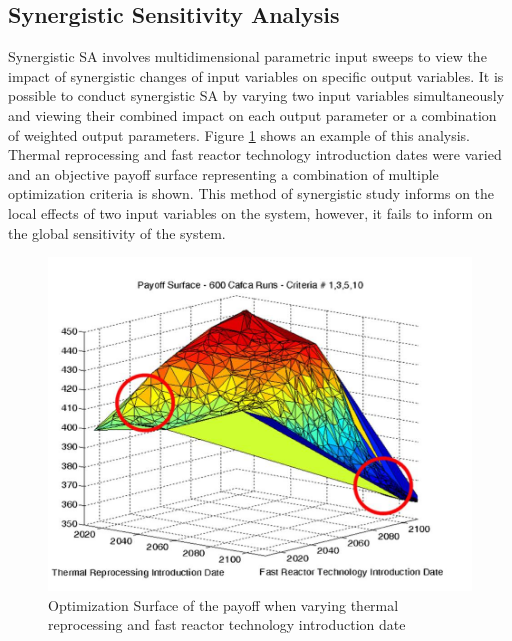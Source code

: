 \subsection{Synergistic Sensitivity Analysis}
Synergistic \gls{SA} involves multidimensional parametric 
input sweeps to view the impact of synergistic changes of input 
variables on specific output variables. 
It is possible to conduct synergistic \gls{SA} by varying 
two input variables simultaneously and viewing their 
combined impact on each output parameter or a combination 
of weighted output parameters. 
Figure \ref{fig:passerini_payoff} shows an example of this analysis.
Thermal reprocessing and fast reactor technology introduction dates
were varied and an objective payoff surface representing a combination 
of multiple optimization criteria is shown. 
This method of synergistic study informs on the local effects of 
two input variables on the system, however, it fails to inform 
on the global sensitivity of the system. 

\begin{figure}[]
	\begin{center}
		\includegraphics[scale=0.25]{./figures/passerini_payoff.jpg}
	\end{center}	
		\caption{Optimization Surface of the payoff when varying thermal 
		reprocessing and fast reactor technology introduction date
		\cite{passerini_systematic_2014}}
	\label{fig:passerini_payoff}
\end{figure} 

